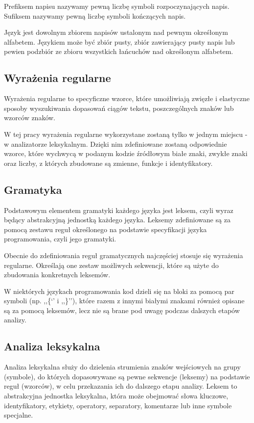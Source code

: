 \documentclass[a4paper,12pt,twoside]{article}
\begin{document}
Prefiksem napisu nazywamy pewną liczbę symboli rozpoczynających napis. Sufiksem nazywamy pewną liczbę symboli kończących napis. 

Język jest dowolnym zbiorem napisów ustalonym nad pewnym okreśłonym alfabetem. Językiem może być zbiór pusty, zbiór zawierający pusty napis lub pewien podzbiór ze zbioru wszystkich łańcuchów nad określonym alfabetem.

\subsection{Wyrażenia regularne}

Wyrażenia regularne to specyficzne wzorce, które umożliwiają zwięzłe i elastyczne sposoby wyszukiwania dopasowań ciągów tekstu, poszczególnych znaków lub wzorców znaków.

W tej pracy wyrażenia regularne wykorzystane zostaną tylko w jednym miejscu - w analizatorze leksykalnym. Dzięki nim zdefiniowane zostaną odpowiednie wzorce, które wychwycą w podanym kodzie źródłowym białe znaki, zwykłe znaki oraz liczby, z których zbudowane są zmienne, funkcje i identyfikatory.

\subsection{Gramatyka}

Podstawowym elementem gramatyki każdego języka jest leksem, czyli wyraz będący abstrakcyjną jednostką każdego języka. Leksemy zdefiniowane są za pomocą zestawu reguł określonego na podstawie specyfikacji języka programowania, czyli jego gramatyki.

Obecnie do zdefiniowania reguł gramatycznych najczęściej stosuje się wyrażenia regularne. Określają one zestaw możliwych sekwencji, które są użyte do zbudowania konkretnych leksemów.

W niektórych językach programowania kod dzieli się na bloki za pomocą par symboli (np. ,,\{‘’ i ,,\}’’), które razem z innymi białymi znakami również opisane są za pomocą leksemów, lecz nie są brane pod uwagę podczas dalszych etapów analizy.

\subsection{Analiza leksykalna}

Analiza leksykalna służy do dzielenia strumienia znaków wejściowych na grupy (symbole), do których dopasowywane są pewne sekwencje (leksemy) na podstawie reguł (wzorców), w celu przekazania ich do dalszego etapu analizy. Leksem to abstrakcyjna jednostka leksykalna, która może obejmować słowa kluczowe, identyfikatory, etykiety, operatory, separatory, komentarze lub inne symbole specjalne.
\end{document}
